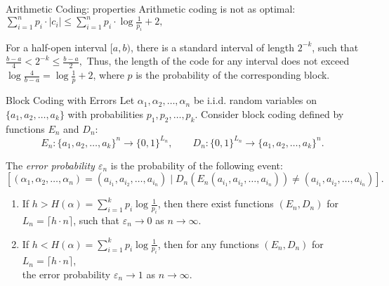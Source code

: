 \documentclass[handout,aspectratio=169]{beamer}
\newcommand{\seqn}[2]{{#1}_1,{#1}_2,\dotsc,{#1}_{#2}}
\newcommand{\seqin}[3]{{#1}_{{#2}_1},{#1}_{{#2}_2},\dotsc,{#1}_{{#2}_{#3}}}
\begin{document}
    \begin{frame}{Arithmetic Coding: properties}
        Arithmetic coding is not as optimal:
        $
        \sum_{i=1}^n p_i \cdot |c_i| \le \sum_{i=1}^n p_i \cdot \log \frac{1}{p_i} + 2,
        $
        \pause
        \begin{theorem}
            For a half-open interval \([a,b)\), there is a standard interval of length \(2^{-k}\), such that
            \(
            \frac{b-a}{4} < 2^{-k} \le \frac{b-a}{2},
            \)
            Thus, the length of the code for any interval does not exceed \(\log \frac{4}{b-a} = \log \frac{1}{p} + 2\), where \(p\) is the probability of the corresponding block.
        \end{theorem}
        \vspace{3cm}

    \end{frame}

    \begin{frame}{Block Coding with Errors}
        Let \(\seqn{\alpha}{n}\) be i.i.d. random variables on \(\{\seqn{a}{k}\}\) with probabilities \(\seqn{p}{k}\). Consider block coding defined by functions \(E_n\) and \(D_n\):
        \[
        E_n:\{\seqn{a}{k}\}^n \to \{0,1\}^{L_n},\qquad
        D_n:\{0,1\}^{L_n} \to \{\seqn{a}{k}\}^n.
        \]

            The \emph{error probability \(\varepsilon_n\)} is the probability of the following event:
            \[
            [(\seqn{\alpha}{n}) = (\seqin{a}{i}{n}) \mid D_n(E_n(\seqin{a}{i}{n}))\neq (\seqin{a}{i}{n})].
            \]
        \begin{theorem}[Shannon]\label{thm:blockcoding}
            \begin{enumerate}
                \item If \(h > H(\alpha) = \sum_{i=1}^{k} p_i \log \frac{1}{p_i}\), then there exist functions \((E_n, D_n)\) for \(L_n = \lceil h \cdot n \rceil\), such that \(\varepsilon_n \to 0\) as \(n \to \infty\).

                \item If \(h < H(\alpha) = \sum_{i=1}^{k} p_i \log \frac{1}{p_i}\), then for any functions \((E_n, D_n)\) for \(L_n = \lceil h \cdot n \rceil\),\\ the error probability \(\varepsilon_n \to 1\) as \(n \to \infty\).
            \end{enumerate}
        \end{theorem}
    \end{frame}
\end{document}
